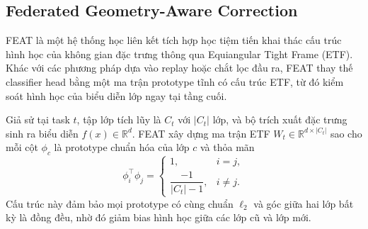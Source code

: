

\subsection{Federated Geometry-Aware Correction} \cite{qi2026feat} FEAT là một hệ thống học liên kết tích hợp học tiệm tiến khai thác cấu trúc hình học của không gian đặc trưng thông qua Equiangular Tight Frame (ETF). Khác với các phương pháp dựa vào replay hoặc chắt lọc đầu ra, FEAT thay thế classifier head bằng một ma trận prototype tĩnh có cấu trúc ETF, từ đó kiểm soát hình học của biểu diễn lớp ngay tại tầng cuối.

Giả sử tại task $t$, tập lớp tích lũy là $C_t$ với $|C_t|$ lớp, và bộ trích xuất đặc trưng sinh ra biểu diễn $f(x) \in \mathbb{R}^d$. FEAT xây dựng ma trận ETF $W_t \in \mathbb{R}^{d \times |C_t|}$ sao cho mỗi cột $\phi_c$ là prototype chuẩn hóa của lớp $c$ và thỏa mãn
\[
\phi_i^{\top} \phi_j =
\begin{cases}
1, & i=j,\\
\dfrac{-1}{|C_t|-1}, & i\neq j.
\end{cases}
\]
Cấu trúc này đảm bảo mọi prototype có cùng chuẩn $\ell_2$ và góc giữa hai lớp bất kỳ là đồng đều, nhờ đó giảm bias hình học giữa các lớp cũ và lớp mới.


